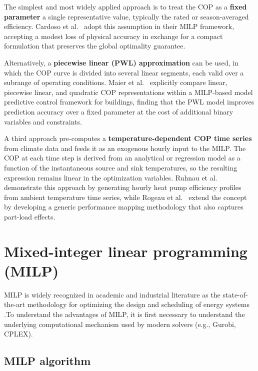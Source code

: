 \documentclass[11pt,a4paper]{report}
\begin{document}
The simplest and most widely applied approach is to treat the COP as a \textbf{fixed parameter} a single representative value, typically the rated or season-averaged efficiency. Cardoso et al.~\cite{cardoso2014milp} adopt this assumption in their MILP framework, accepting a modest loss of physical accuracy in exchange for a compact formulation that preserves the global optimality guarantee.

Alternatively, a \textbf{piecewise linear (PWL) approximation} can be used, in which the COP curve is divided into several linear segments, each valid over a subrange of operating conditions. Maier et al.~\cite{maier2022mpc} explicitly compare linear, piecewise linear, and quadratic COP representations within a MILP-based model predictive control framework for buildings, finding that the PWL model improves prediction accuracy over a fixed parameter at the cost of additional binary variables and constraints.

A third approach pre-computes a \textbf{temperature-dependent COP time series} from climate data and feeds it as an exogenous hourly input to the MILP. The COP at each time step is derived from an analytical or regression model as a function of the instantaneous source and sink temperatures, so the resulting expression remains linear in the optimization variables. Ruhnau et al.~\cite{Ruhnau2019} demonstrate this approach by generating hourly heat pump efficiency profiles from ambient temperature time series, while Rogeau et al.~\cite{Rogeau2024HPPL} extend the concept by developing a generic performance mapping methodology that also captures part-load effects.


\section{Mixed-integer linear programming (MILP)}
\label{sub:milp_advantages}

MILP is widely recognized in academic and industrial literature as the state-of-the-art methodology for optimizing the design and scheduling of energy systems\cite{Stinner2021ModelComplexity} \cite{Urbanucci2018Limits}.To understand the advantages of MILP, it is first necessary to understand the underlying computational mechanism used by modern solvers (e.g., Gurobi, CPLEX). 
\subsection{ MILP algorithm}
\end{document}
